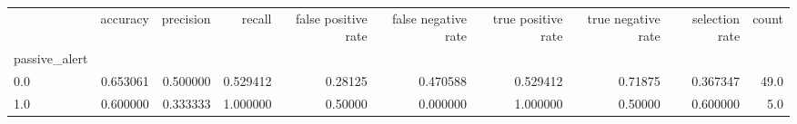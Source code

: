 \begin{tabular}{lrrrrrrrrr}
\toprule
{} &  accuracy &  precision &    recall &  false positive rate &  false negative rate &  true positive rate &  true negative rate &  selection rate &  count \\
passive\_alert &           &            &           &                      &                      &                     &                     &                 &        \\
\midrule
0.0           &  0.653061 &   0.500000 &  0.529412 &              0.28125 &             0.470588 &            0.529412 &             0.71875 &        0.367347 &   49.0 \\
1.0           &  0.600000 &   0.333333 &  1.000000 &              0.50000 &             0.000000 &            1.000000 &             0.50000 &        0.600000 &    5.0 \\
\bottomrule
\end{tabular}
